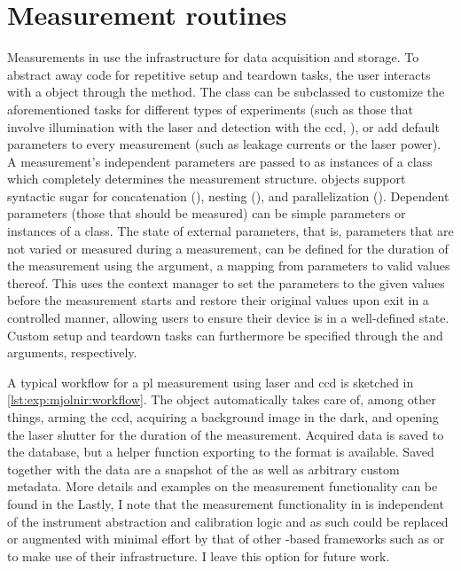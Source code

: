 \section{Measurement routines}\label{sec:exp:mjolnir:measurement}
Measurements in \mjolnir use the \qcodes infrastructure for data acquisition and storage.
To abstract away code for repetitive setup and teardown tasks, the user interacts with a  object through the  method.
The class can be subclassed to customize the aforementioned tasks for different types of experiments (such as those that involve illumination with the laser and detection with the \gls{ccd}, ), or add default parameters to every measurement (such as leakage currents or the laser power).
A measurement's independent parameters are passed to  as instances of a  class which completely determines the measurement structure.
 objects support syntactic sugar for concatenation (), nesting (\code{|}), and parallelization (\code{&}).
Dependent parameters (those that should be measured) can be simple parameters or instances of a  class.
The state of external parameters, that is, parameters that are not varied or measured during a measurement, can be defined for the duration of the measurement using the  argument, a mapping from \qcodes parameters to valid values thereof.
This uses the  context manager to set the parameters to the given values before the measurement starts and restore their original values upon exit in a controlled manner, allowing users to ensure their device is in a well-defined state.
Custom setup and teardown tasks can furthermore be specified through the  and  arguments, respectively.

A typical workflow for a \gls{pl} measurement using laser and \gls{ccd} is sketched in \cref{lst:exp:mjolnir:workflow}.
The  object automatically takes care of, among other things, arming the \gls{ccd}, acquiring a background image in the dark, and opening the laser shutter for the duration of the measurement.
Acquired data is saved to the \qcodes database, but a helper function exporting to the \xarray {} format is available.
Saved together with the data are a snapshot of the \qcodes {} as well as arbitrary custom metadata.
More details and examples on the measurement functionality can be found in the 
Lastly, I note that the measurement functionality in \mjolnir is independent of the instrument abstraction and calibration logic and as such could be replaced or augmented with minimal effort by that of other \qcodes-based frameworks such as  or  to make use of their infrastructure.
I leave this option for future work.

